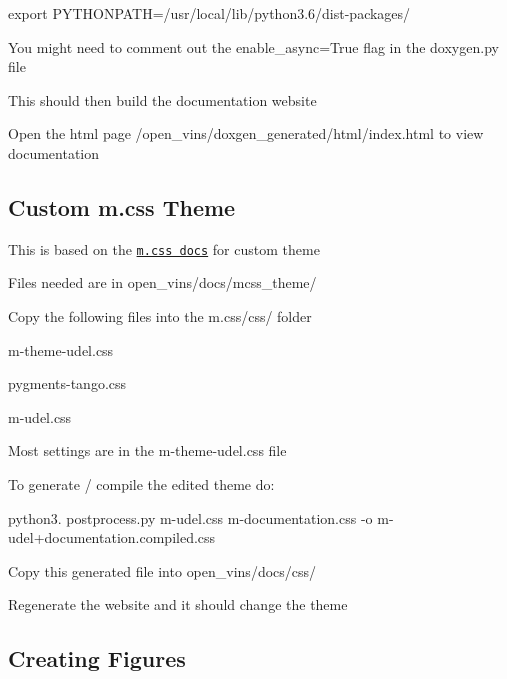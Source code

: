\begin{DoxyEnumerate}
\begin{DoxyItemize}
\item {\ttfamily export P\+Y\+T\+H\+O\+N\+P\+A\+TH=/usr/local/lib/python3.6/dist-\/packages/}
\end{DoxyItemize}
\item You might need to comment out the {\ttfamily enable\+\_\+async=True} flag in the doxygen.\+py file
\item This should then build the documentation website
\item Open the html page {\ttfamily /open\+\_\+vins/doxgen\+\_\+generated/html/index.html} to view documentation
\end{DoxyEnumerate}\hypertarget{dev-docs_developers-theme}{}\subsection{Custom m.\+css Theme}\label{dev-docs_developers-theme}

\begin{DoxyEnumerate}
\item This is based on the \href{https://mcss.mosra.cz/css/themes/#make-your-own}{\tt m.\+css docs} for custom theme
\item Files needed are in {\ttfamily open\+\_\+vins/docs/mcss\+\_\+theme/}
\item Copy the following files into the {\ttfamily m.\+css/css/} folder
\begin{DoxyItemize}
\item m-\/theme-\/udel.\+css
\item pygments-\/tango.\+css
\item m-\/udel.\+css
\end{DoxyItemize}
\item Most settings are in the {\ttfamily m-\/theme-\/udel.\+css} file
\item To generate / compile the edited theme do\+:
\begin{DoxyItemize}
\item {\ttfamily python3. postprocess.\+py m-\/udel.\+css m-\/documentation.\+css -\/o m-\/udel+documentation.compiled.\+css}
\item Copy this generated file into {\ttfamily open\+\_\+vins/docs/css/}
\item Regenerate the website and it should change the theme
\end{DoxyItemize}
\end{DoxyEnumerate}\hypertarget{dev-docs_developers-figures}{}\subsection{Creating Figures}\label{dev-docs_developers-figures}

